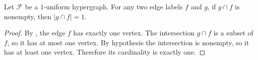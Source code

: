 \begin{helper}
Let $\mathcal F$ be a $1$-uniform hypergraph.  For any two edge labels
$f$ and $g$, if $g\cap f$ is nonempty, then $|g\cap f|=1$.
\end{helper}
\begin{proof}
By , the edge $f$ has exactly one vertex.
The intersection $g\cap f$ is a subset of $f$, so it has at most one
vertex.  By hypothesis the intersection is nonempty, so it has at least
one vertex.  Therefore its cardinality is exactly one.
\end{proof}
